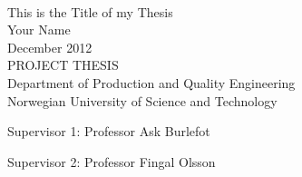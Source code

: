 \thispagestyle{empty}

\mbox{}\\[6pc]
\begin{center}
\Huge{This is the Title of my Thesis}\\[2pc]

\Large{Your Name}\\[1pc]
\large{December 2012}\\[2pc]

PROJECT THESIS\\
Department of Production and Quality Engineering\\
Norwegian University of Science and Technology
\end{center}
\vfill

\noindent Supervisor 1: Professor Ask Burlefot

\noindent Supervisor 2: Professor Fingal Olsson

